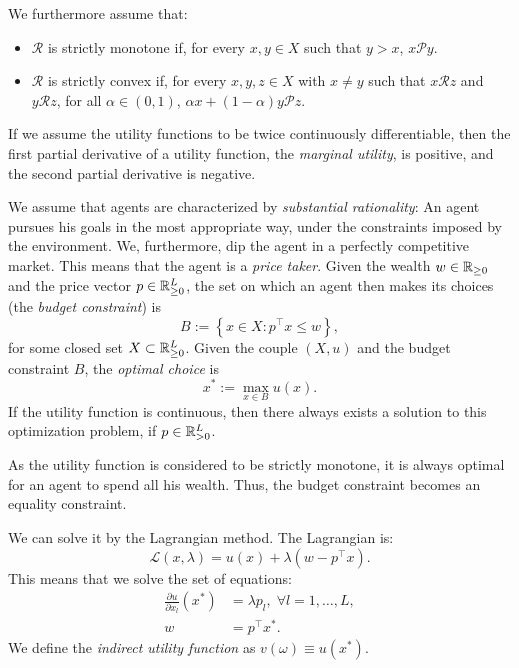 \documentclass[twoside]{article}
\begin{document}
\begin{assumption}
    We furthermore assume that:
    \begin{itemize}
        \item $\mathcal{R}$ is strictly monotone if, for every $x, y \in X$ such that $y > x$, $x \mathcal{P} y$.
        \item $\mathcal{R}$ is strictly convex if, for every $x, y, z \in X$ with $x \not = y$ such that $x \mathcal{R} z$ and $y \mathcal{R} z$, for all $\alpha \in (0, 1)$, $\alpha x + (1 - \alpha) y \mathcal{P} z$.
    \end{itemize}
\end{assumption}
If we assume the utility functions to be twice continuously differentiable, then the first partial derivative of a utility function, the \textit{marginal utility}, is positive, and the second partial derivative is negative.

We assume that agents are characterized by \textit{substantial rationality}: An agent pursues his goals in the most appropriate way, under the constraints imposed by the environment. We, furthermore, dip the agent in a perfectly competitive market. This means that the agent is a \textit{price taker}. Given the wealth $w \in \mathbb{R}_{\geq0}$ and the price vector $p \in \mathbb{R}_{\geq 0}^L$, the set on which an agent then makes its choices (the \textit{budget constraint}) is
\[
B := \left\{x \in X : p^\top x \leq w\right\},
\]
for some closed set $X \subset \mathbb{R}_{\geq0}^L$. Given the couple $(X, u)$ and the budget constraint $B$, the \textit{optimal choice} is
\[
    x^* := \max_{x \in B} u(x).
\]
If the utility function is continuous, then there always exists a solution to this optimization problem, if $p \in \mathbb{R}_{>0}^L$.

\begin{explanation}
    As the utility function is considered to be strictly monotone, it is always optimal for an agent to spend all his wealth. Thus, the budget constraint becomes an equality constraint.
\end{explanation}

We can solve it by the Lagrangian method. The Lagrangian is:
\[
    \mathcal{L}(x, \lambda) = u(x) + \lambda (w - p^\top x).
\]
This means that we solve the set of equations:
\begin{align*}
    \frac{\partial u}{\partial x_l}\left(x^*\right) &= \lambda p_l, \; \forall l = 1, \dots, L, \\
    w &= p^\top x^*.
\end{align*}
We define the \textit{indirect utility function} as $v(\omega) \equiv u(x^*)$. 
\end{document}
